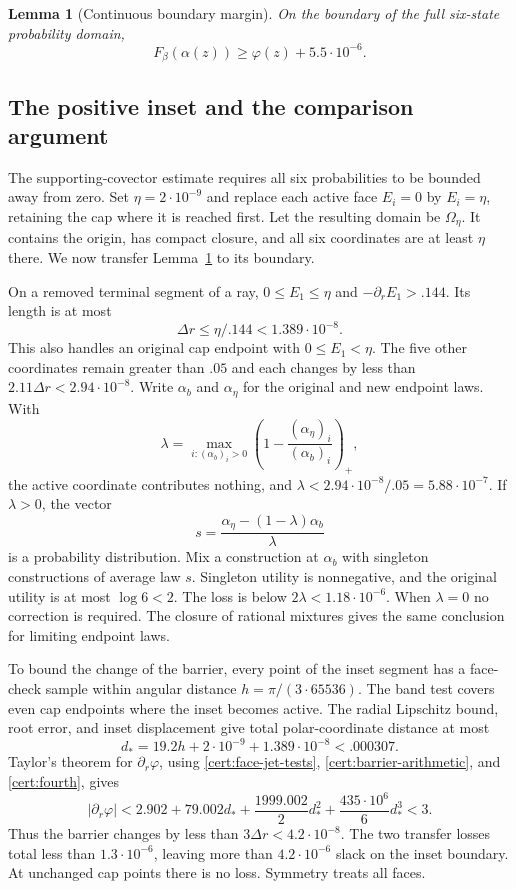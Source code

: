 \documentclass[11pt]{article}
\numberwithin{equation}{section}
\newtheorem{lemma}[theorem]{Lemma}
\theoremstyle{definition}
\theoremstyle{remark}
\begin{document}
\begin{lemma}[Continuous boundary margin]\label{cert:boundary-lemma}
On the boundary of the full six-state probability domain,
\[
 F_\beta(\alpha(z))\geq\varphi(z)+5.5\cdot10^{-6}.
\]
\end{lemma}

\subsection{The positive inset and the comparison argument}
\label{cert:inset}

The supporting-covector estimate requires all six probabilities to be
bounded away from zero.  Set $\eta=2\cdot10^{-9}$ and replace each active
face $E_i=0$ by $E_i=\eta$, retaining the cap where it is reached first.
Let the resulting domain be $\Omega_\eta$.  It contains the origin,
has compact closure, and all six coordinates are at least $\eta$ there.
We now transfer Lemma~\ref{cert:boundary-lemma} to its boundary.

On a removed terminal segment of a ray,
$0\leq E_1\leq\eta$ and $-\partial_rE_1>.144$.  Its length is at most
\begin{equation}\label{cert:inset-distance}
 \Delta r\leq\eta/.144<1.389\cdot10^{-8}.
\end{equation}
This also handles an original cap endpoint with $0\leq E_1<\eta$.
The five other coordinates remain greater than $.05$ and each changes
by less than $2.11\Delta r<2.94\cdot10^{-8}$.  Write $\alpha_b$ and
$\alpha_\eta$ for the original and new endpoint laws.  With
\[
 \lambda=\max_{i:(\alpha_b)_i>0}
             \left(1-\frac{(\alpha_\eta)_i}{(\alpha_b)_i}\right)_+,
\]
the active coordinate contributes nothing, and
$\lambda<2.94\cdot10^{-8}/.05=5.88\cdot10^{-7}$.
If $\lambda>0$, the vector
\[
 s=\frac{\alpha_\eta-(1-\lambda)\alpha_b}{\lambda}
\]
is a probability distribution.  Mix a construction at $\alpha_b$ with
singleton constructions of average law $s$.  Singleton utility is
nonnegative, and the original utility is at most $\log6<2$.
The loss is below $2\lambda<1.18\cdot10^{-6}$.  When $\lambda=0$ no
correction is required.  The closure of rational mixtures gives the
same conclusion for limiting endpoint laws.

To bound the change of the barrier, every point of the inset segment has
a face-check sample within angular distance $h=\pi/(3\cdot65536)$.
The band test covers even cap endpoints where the inset becomes active.
The radial Lipschitz bound, root error, and inset displacement give total
polar-coordinate distance at most
\[
 d_*=19.2h+2\cdot10^{-9}+1.389\cdot10^{-8}<.000307.
\]
Taylor's theorem for $\partial_r\varphi$, using
\eqref{cert:face-jet-tests}, \eqref{cert:barrier-arithmetic}, and
\eqref{cert:fourth}, gives
\[
 |\partial_r\varphi|
 <2.902+79.002d_*+\frac{1999.002}{2}d_*^2
                         +\frac{435\cdot10^6}{6}d_*^3<3.
\]
Thus the barrier changes by less than $3\Delta r<4.2\cdot10^{-8}$.
The two transfer losses total less than $1.3\cdot10^{-6}$, leaving
more than $4.2\cdot10^{-6}$ slack on the inset boundary.  At unchanged
cap points there is no loss.  Symmetry treats all faces.
\end{document}
